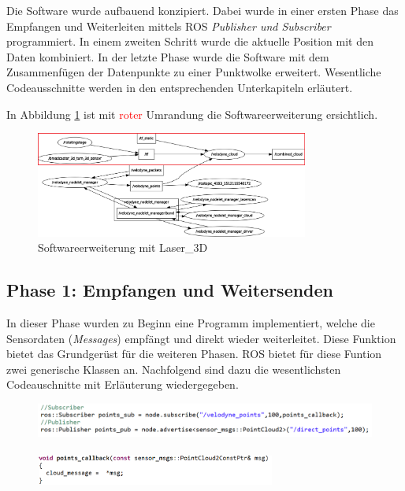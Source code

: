 Die Software wurde aufbauend konzipiert. Dabei wurde in einer ersten Phase das Empfangen und Weiterleiten mittels ROS \textit{Publisher und Subscriber} programmiert. In einem zweiten Schritt wurde die aktuelle Position mit den Daten kombiniert. In der letzte Phase wurde die Software mit dem Zusammenfügen der Datenpunkte zu einer Punktwolke erweitert. Wesentliche Codeausschnitte werden in den entsprechenden Unterkapiteln erläutert.

In Abbildung \ref{fig:rqt_graph_erweitert_2} ist mit \textcolor{red}{roter} Umrandung die Softwareerweiterung ersichtlich. 

\begin{figure}[H]
	\centering
	\includegraphics[width=0.8\textwidth]{resources/rqt_graph_erweitert_2.png}
	\caption{Softwareerweiterung mit Laser\_3D}
	\label{fig:rqt_graph_erweitert_2}
\end{figure} 
\subsection{Phase 1: Empfangen und Weitersenden}
\label{subsec:Phase2}
In dieser Phase wurden zu Beginn eine Programm implementiert, welche die Sensordaten (\textit{Messages}) empfängt und direkt wieder weiterleitet. Diese Funktion bietet das Grundgerüst für die weiteren Phasen. ROS bietet für diese Funtion zwei generische Klassen an.  Nachfolgend sind dazu die wesentlichsten Codeauschnitte mit Erläuterung wiedergegeben. \cite{pubsub}

\begin{figure}[H]

	\includegraphics[width=1.0\textwidth]{resources/sourcecode/pubsub.png} \\
	\\
	\includegraphics[width=0.7\textwidth]{resources/sourcecode/callback.png} 
	\label{fig:pubsub}
\end{figure} 

